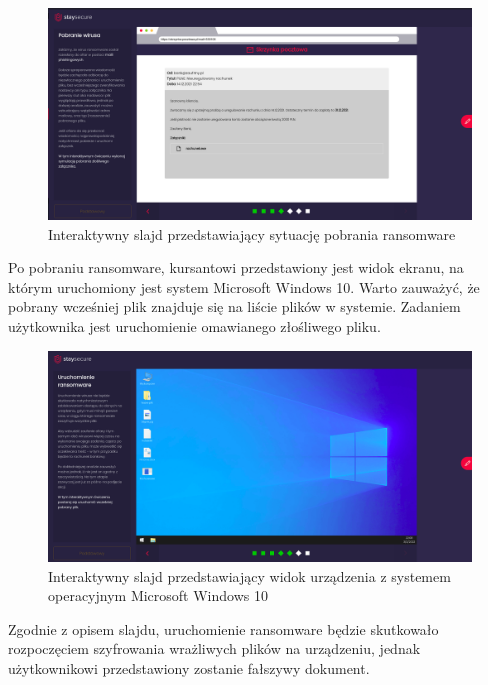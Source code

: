\documentclass[12pt,twoside]{article}
\begin{document}
\begin{figure}[H]
	\centering
	\includegraphics[width=0.99\linewidth]{figures/ransomware-slide-screenshot1}
	\caption{Interaktywny slajd przedstawiający sytuację pobrania ransomware}
\end{figure}

Po pobraniu ransomware, kursantowi przedstawiony jest widok ekranu, na którym uruchomiony jest system Microsoft Windows 10. Warto zauważyć, że pobrany wcześniej plik znajduje się na liście plików w systemie. Zadaniem użytkownika jest uruchomienie omawianego złośliwego pliku.

\begin{figure}[H]
	\centering
	\includegraphics[width=0.99\linewidth]{figures/ransomware-slide-screenshot2}
	\caption{Interaktywny slajd przedstawiający widok urządzenia z systemem operacyjnym Microsoft Windows 10}
\end{figure}

Zgodnie z opisem slajdu, uruchomienie ransomware będzie skutkowało rozpoczęciem szyfrowania wrażliwych plików na urządzeniu, jednak użytkownikowi przedstawiony zostanie fałszywy dokument. 
\end{document}
